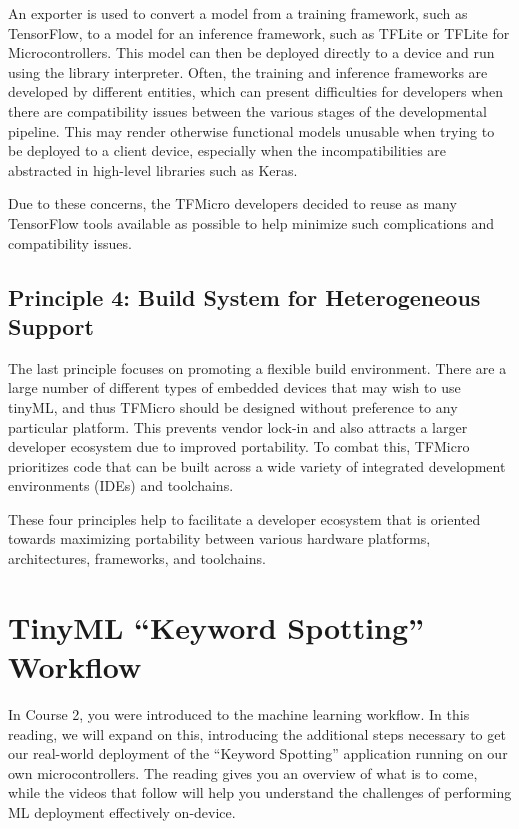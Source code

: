  An exporter is used to convert a model from a training framework, such as TensorFlow, to a model for an inference framework, such as TFLite or TFLite for Microcontrollers. This model can then be deployed directly to a device and run using the library interpreter. Often, the training and inference frameworks are developed by different entities, which can present difficulties for developers when there are compatibility issues between the various stages of the developmental pipeline. This may render otherwise functional models unusable when trying to be deployed to a client device, especially when the incompatibilities are abstracted in high-level libraries such as Keras.
 
 Due to these concerns, the TFMicro developers decided to reuse as many TensorFlow tools available as possible to help minimize such complications and compatibility issues.
 
\subsection{Principle 4: Build System for Heterogeneous Support}

 The last principle focuses on promoting a flexible build environment. There are a large number of different types of embedded devices that may wish to use tinyML, and thus TFMicro should be designed without preference to any particular platform. This prevents vendor lock-in and also attracts a larger developer ecosystem due to improved portability. To combat this, TFMicro prioritizes code that can be built across a wide variety of integrated development environments (IDEs) and toolchains.
 
 These four principles help to facilitate a developer ecosystem that is oriented towards maximizing portability between various hardware platforms, architectures, frameworks, and toolchains.    
 
 
 
 \section{TinyML ``Keyword Spotting'' Workflow}
 
 In Course 2, you were introduced to the machine learning workflow. In this reading, we will expand on this, introducing the additional steps necessary to get our real-world deployment of the “Keyword Spotting” application running on our own microcontrollers. The reading gives you an overview of what is to come, while the videos that follow will help you understand the challenges of performing ML deployment effectively on-device.
 
